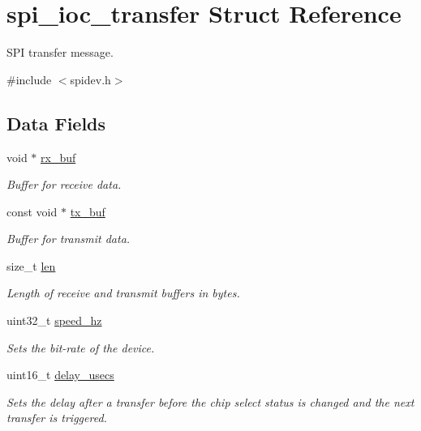 \hypertarget{structspi__ioc__transfer}{}\section{spi\+\_\+ioc\+\_\+transfer Struct Reference}
\label{structspi__ioc__transfer}


S\+PI transfer message.  




{\ttfamily \#include $<$spidev.\+h$>$}

\subsection*{Data Fields}
\begin{DoxyCompactItemize}
\item 
void $\ast$ \mbox{\hyperlink{group__SPILinux_ga598f15883066b4a097ea5d62e04cfc78}{rx\+\_\+buf}}
\begin{DoxyCompactList}\small\item\em Buffer for receive data. \end{DoxyCompactList}\item 
const void $\ast$ \mbox{\hyperlink{group__SPILinux_gafc9ba3d61346406344752100c42244c5}{tx\+\_\+buf}}
\begin{DoxyCompactList}\small\item\em Buffer for transmit data. \end{DoxyCompactList}\item 
size\+\_\+t \mbox{\hyperlink{group__SPILinux_gaeffdeb47a920abe43882e32be721f7af}{len}}
\begin{DoxyCompactList}\small\item\em Length of receive and transmit buffers in bytes. \end{DoxyCompactList}\item 
uint32\+\_\+t \mbox{\hyperlink{group__SPILinux_ga54a0d2d693971f1443bdc4b76915df52}{speed\+\_\+hz}}
\begin{DoxyCompactList}\small\item\em Sets the bit-\/rate of the device. \end{DoxyCompactList}\item 
uint16\+\_\+t \mbox{\hyperlink{group__SPILinux_ga8cdb8c28a3607def74af35fefbe72a74}{delay\+\_\+usecs}}
\begin{DoxyCompactList}\small\item\em Sets the delay after a transfer before the chip select status is changed and the next transfer is triggered. \end{DoxyCompactList}\item 

\end{DoxyCompactItemize}
